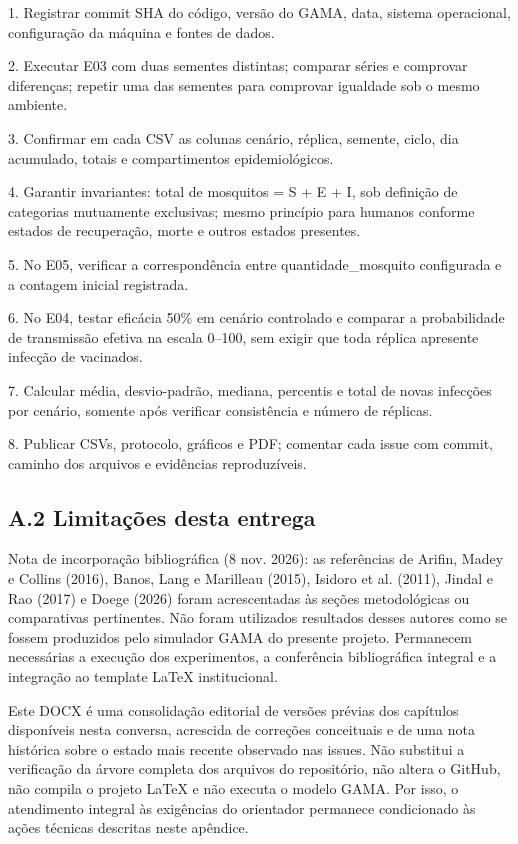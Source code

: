 1. Registrar commit SHA do código, versão do GAMA, data, sistema
operacional, configuração da máquina e fontes de dados.

2. Executar E03 com duas sementes distintas; comparar séries e comprovar
diferenças; repetir uma das sementes para comprovar igualdade sob o
mesmo ambiente.

3. Confirmar em cada CSV as colunas cenário, réplica, semente, ciclo,
dia acumulado, totais e compartimentos epidemiológicos.

4. Garantir invariantes: total de mosquitos = S + E + I, sob definição
de categorias mutuamente exclusivas; mesmo princípio para humanos
conforme estados de recuperação, morte e outros estados presentes.

5. No E05, verificar a correspondência entre quantidade\_mosquito
configurada e a contagem inicial registrada.

6. No E04, testar eficácia 50\% em cenário controlado e comparar a
probabilidade de transmissão efetiva na escala 0--100, sem exigir que
toda réplica apresente infecção de vacinados.

7. Calcular média, desvio-padrão, mediana, percentis e total de novas
infecções por cenário, somente após verificar consistência e número de
réplicas.

8. Publicar CSVs, protocolo, gráficos e PDF; comentar cada issue com
commit, caminho dos arquivos e evidências reproduzíveis.

\subsection{A.2 Limitações desta
entrega}\label{a.2-limitauxe7uxf5es-desta-entrega}

Nota de incorporação bibliográfica (8 nov. 2026): as referências de
Arifin, Madey e Collins (2016), Banos, Lang e Marilleau (2015), Isidoro
et al. (2011), Jindal e Rao (2017) e Doege (2026) foram acrescentadas às
seções metodológicas ou comparativas pertinentes. Não foram utilizados
resultados desses autores como se fossem produzidos pelo simulador GAMA
do presente projeto. Permanecem necessárias a execução dos experimentos,
a conferência bibliográfica integral e a integração ao template LaTeX
institucional.

Este DOCX é uma consolidação editorial de versões prévias dos capítulos
disponíveis nesta conversa, acrescida de correções conceituais e de uma
nota histórica sobre o estado mais recente observado nas issues. Não
substitui a verificação da árvore completa dos arquivos do repositório,
não altera o GitHub, não compila o projeto LaTeX e não executa o modelo
GAMA. Por isso, o atendimento integral às exigências do orientador
permanece condicionado às ações técnicas descritas neste apêndice.
